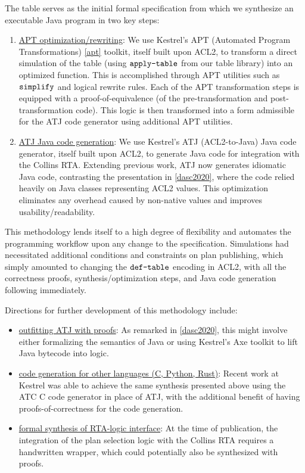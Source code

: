 
The table serves as the initial formal specification from which we synthesize an executable Java program in two key steps:
\begin{enumerate}
\item \underline{APT optimization/rewriting}: We use Kestrel's APT (Automated Program Transformations) \ref{apt} toolkit, itself built upon ACL2, to transform a direct simulation of the table (using $\verb+apply-table+$ from our table library) into an optimized function. This is accomplished through APT utilities such as $\verb+simplify+$ and logical rewrite rules. Each of the APT transformation steps is equipped with a proof-of-equivalence (of the pre-transformation and post-transformation code). This logic is then transformed into a form admissible for the ATJ code generator using additional APT utilities.
\item \underline{ATJ Java code generation}: We use Kestrel's ATJ (ACL2-to-Java) Java code generator, itself built upon ACL2, to generate Java code for integration with the Collins RTA. Extending previous work, ATJ now generates idiomatic Java code, contrasting the presentation in \ref{dasc2020}, where the code relied heavily on Java classes representing ACL2 values. This optimization eliminates any overhead caused by non-native values and improves usability/readability.
\end{enumerate}


This methodology lends itself to a high degree of flexibility and automates the programming workflow upon any change to the specification. Simulations had necessitated additional conditions and constraints on plan publishing, which simply amounted to changing the $\verb+def-table+$ encoding in ACL2, with all the correctness proofs, synthesis/optimization steps, and Java code generation following immediately.


Directions for further development of this methodology include:
\begin{itemize}
\item \underline{outfitting ATJ with proofs}: As remarked in \ref{dasc2020}, this might involve either formalizing the semantics of Java or using Kestrel's Axe toolkit to lift Java bytecode into logic.
\item \underline{code generation for other languages (C, Python, Rust)}: Recent work at Kestrel was able to achieve the same synthesis presented above using the ATC C code generator in place of ATJ, with the additional benefit of having proofs-of-correctness for the code generation.
\item \underline{formal synthesis of RTA-logic interface}: At the time of publication, the integration of the plan selection logic with the Collins RTA requires a handwritten wrapper, which could potentially also be synthesized with proofs.
\end{itemize}
